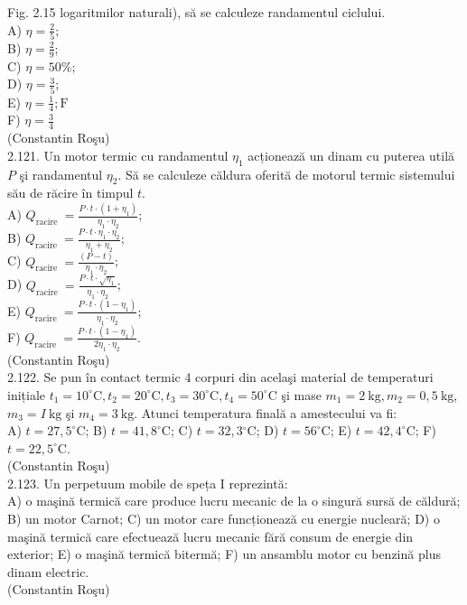 Fig. 2.15 logaritmilor naturali), să se calculeze randamentul ciclului.\\
A) $\eta=\frac{2}{5} ;$\\
B) $\eta=\frac{2}{9}$;\\
C) $\eta=50 \%$;\\
D) $\eta=\frac{3}{5}$;\\
E) $\eta=\frac{1}{4} ; \mathrm{F}$\\
F) $\eta=\frac{3}{4}$\\
(Constantin Roşu)\\
2.121. Un motor termic cu randamentul $\eta_{1}$ acționează un dinam cu puterea utilă $P$ şi randamentul $\eta_{2}$. Să se calculeze căldura oferită de motorul termic sistemului său de răcire în timpul $t$.\\
A) $Q_{\text {racire }}=\frac{P \cdot t \cdot\left(1+\eta_{1}\right)}{\eta_{1} \cdot \eta_{2}}$;\\
B) $Q_{\text {racire }}=\frac{P \cdot t \cdot \eta_{1} \cdot \eta_{2}}{\eta_{1}+\eta_{2}}$;\\
C) $Q_{\text {racire }}=\frac{(P-t)}{\eta_{1} \cdot \eta_{2}}$;\\
D) $Q_{\text {racire }}=\frac{P \cdot t \cdot \sqrt{\eta_{1}}}{\eta_{1} \cdot \eta_{2}}$;\\
E) $Q_{\text {racire }}=\frac{P \cdot t \cdot\left(1-\eta_{1}\right)}{\eta_{1} \cdot \eta_{2}}$;\\
F) $Q_{\text {racire }}=\frac{P \cdot t \cdot\left(1-\eta_{1}\right)}{2 \eta_{1} \cdot \eta_{2}}$.\\
(Constantin Roşu)\\

2.122. Se pun în contact termic 4 corpuri din acelaşi material de temperaturi inițiale $t_{1}=10^{\circ} \mathrm{C}, t_{2}=20^{\circ} \mathrm{C}, t_{3}=30^{\circ} \mathrm{C}, t_{4}=50^{\circ} \mathrm{C}$ şi mase $m_{1}=2 \mathrm{~kg}, m_{2}=0,5 \mathrm{~kg}$, $m_{3}=I \mathrm{~kg}$ şi $m_{4}=3 \mathrm{~kg}$. Atunci temperatura finală a amestecului va fi:\\ A) $t=27,5^{\circ} \mathrm{C}$; B) $t=41,8^{\circ} \mathrm{C}$; C) $t=32,3{ }^{\circ} \mathrm{C}$; D) $t=56^{\circ} \mathrm{C}$; E) $t=42,4^{\circ} \mathrm{C}$; F) $t=22,5^{\circ} \mathrm{C}$.\\ (Constantin Roşu)\\

2.123. Un perpetuum mobile de speța I reprezintă:\\ A) o maşină termică care produce lucru mecanic de la o singură sursă de căldură; B) un motor Carnot; C) un motor care funcționează cu energie nucleară; D) o maşină termică care efectuează lucru mecanic fără consum de energie din exterior; E) o maşină termică bitermă; F) un ansamblu motor cu benzină plus dinam electric.\\ (Constantin Roşu)\\

